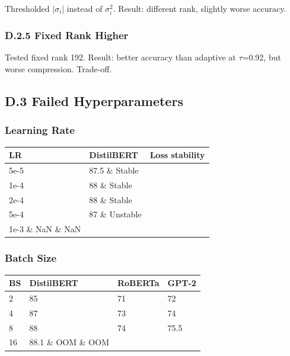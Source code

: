 Thresholded $|\sigma_i|$ instead of $\sigma_i^2$. Result: different rank, 
slightly worse accuracy.

\subsubsection{D.2.5 Fixed Rank Higher}

Tested fixed rank 192. Result: better accuracy than adaptive at $\tau$=0.92, 
but worse compression. Trade-off.

\subsection{D.3 Failed Hyperparameters}

\subsubsection{Learning Rate}

\begin{table}[H]
\centering
\small
\begin{tabular}{lll}
\toprule
\textbf{LR} & \textbf{DistilBERT} & \textbf{Loss stability} \\
\midrule
5e-5 & 87.5 \& Stable \\
1e-4 & 88 \& Stable \\
2e-4 & 88 \& Stable \\
5e-4 & 87 \& Unstable \\
1e-3 \& NaN \& NaN \\
\bottomrule
\end{tabular}
\end{table}

\subsubsection{Batch Size}

\begin{table}[H]
\centering
\small
\begin{tabular}{llll}
\toprule
\textbf{BS} & \textbf{DistilBERT} & \textbf{RoBERTa} & \textbf{GPT-2} \\
\midrule
2 & 85 & 71 & 72 \\
4 & 87 & 73 & 74 \\
8 & 88 & 74 & 75.5 \\
16 & 88.1 \& OOM \& OOM \\
\bottomrule
\end{tabular}
\end{table}

